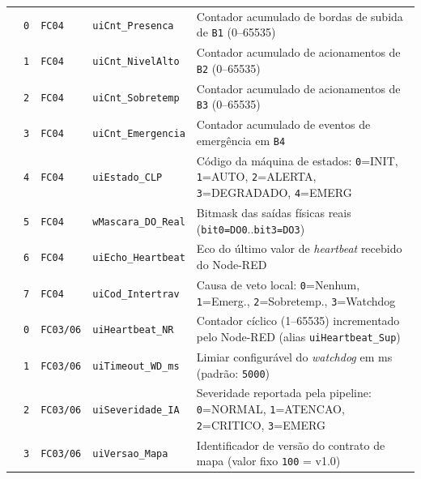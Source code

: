 \begin{quadro}[htb]
\begin{tabularx}{\textwidth}{|>{\RaggedRight\arraybackslash}p{2.10cm}|p{0.80cm}|p{1.25cm}|p{3.60cm}|L|}
    \hline
      & \texttt{0} & \texttt{FC04} & \texttt{uiCnt\_Presenca} & Contador acumulado de bordas de subida de \texttt{B1} (0--65535) \\ 
      & \texttt{1} & \texttt{FC04} & \texttt{uiCnt\_NivelAlto} & Contador acumulado de acionamentos de \texttt{B2} (0--65535) \\ 
      & \texttt{2} & \texttt{FC04} & \texttt{uiCnt\_Sobretemp} & Contador acumulado de acionamentos de \texttt{B3} (0--65535) \\ 
      & \texttt{3} & \texttt{FC04} & \texttt{uiCnt\_Emergencia} & Contador acumulado de eventos de emergência em \texttt{B4} \\ 
      & \texttt{4} & \texttt{FC04} & \texttt{uiEstado\_CLP} & Código da máquina de estados: \texttt{0}=INIT, \texttt{1}=AUTO, \texttt{2}=ALERTA, \texttt{3}=DEGRADADO, \texttt{4}=EMERG \\ 
      & \texttt{5} & \texttt{FC04} & \texttt{wMascara\_DO\_Real} & Bitmask das saídas físicas reais (\texttt{bit0=DO0}..\texttt{bit3=DO3}) \\ 
      & \texttt{6} & \texttt{FC04} & \texttt{uiEcho\_Heartbeat} & Eco do último valor de \textit{heartbeat} recebido do Node-RED \\ 
      & \texttt{7} & \texttt{FC04} & \texttt{uiCod\_Intertrav} & Causa de veto local: \texttt{0}=Nenhum, \texttt{1}=Emerg., \texttt{2}=Sobretemp., \texttt{3}=Watchdog \\
    \hline
      & \texttt{0} & \texttt{FC03/06} & \texttt{uiHeartbeat\_NR} & Contador cíclico (1--65535) incrementado pelo Node-RED (alias \texttt{uiHeartbeat\_Sup}) \\ 
      & \texttt{1} & \texttt{FC03/06} & \texttt{uiTimeout\_WD\_ms} & Limiar configurável do \textit{watchdog} em ms (padrão: \texttt{5000}) \\ 
      & \texttt{2} & \texttt{FC03/06} & \texttt{uiSeveridade\_IA} & Severidade reportada pela pipeline: \texttt{0}=NORMAL, \texttt{1}=ATENCAO, \texttt{2}=CRITICO, \texttt{3}=EMERG \\ 
      & \texttt{3} & \texttt{FC03/06} & \texttt{uiVersao\_Mapa} & Identificador de versão do contrato de mapa (valor fixo \texttt{100} = v1.0) \\
    \hline
  \end{tabularx}
\end{quadro}

